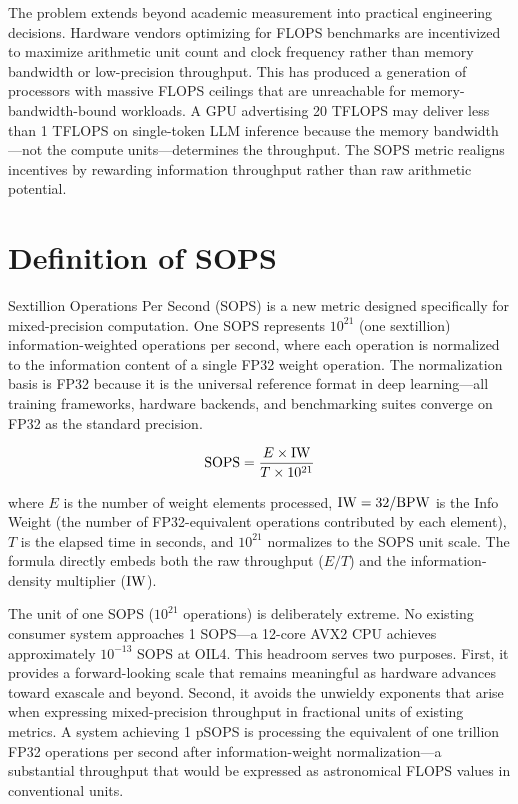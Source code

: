 The problem extends beyond academic measurement into practical engineering decisions. Hardware vendors optimizing for FLOPS benchmarks are incentivized to maximize arithmetic unit count and clock frequency rather than memory bandwidth or low-precision throughput. This has produced a generation of processors with massive FLOPS ceilings that are unreachable for memory-bandwidth-bound workloads. A GPU advertising 20 TFLOPS may deliver less than 1 TFLOPS on single-token LLM inference because the memory bandwidth---not the compute units---determines the throughput. The SOPS metric realigns incentives by rewarding information throughput rather than raw arithmetic potential.

\section{Definition of SOPS}
\label{sec:sops_definition}

Sextillion Operations Per Second (SOPS) is a new metric designed specifically for mixed-precision computation. One SOPS represents $10^{21}$ (one sextillion) information-weighted operations per second, where each operation is normalized to the information content of a single FP32 weight operation. The normalization basis is FP32 because it is the universal reference format in deep learning---all training frameworks, hardware backends, and benchmarking suites converge on FP32 as the standard precision.

\begin{equation}
\text{SOPS} = \frac{E \times \mathrm{IW}}{T \times 10^{21}}
\label{eq:sops_definition}
\end{equation}

where $E$ is the number of weight elements processed, $\mathrm{IW} = 32 / \textnormal{BPW}$ is the Info Weight (the number of FP32-equivalent operations contributed by each element), $T$ is the elapsed time in seconds, and $10^{21}$ normalizes to the SOPS unit scale. The formula directly embeds both the raw throughput ($E/T$) and the information-density multiplier ($\mathrm{IW}$).

The unit of one SOPS ($10^{21}$ operations) is deliberately extreme. No existing consumer system approaches 1 SOPS---a 12-core AVX2 CPU achieves approximately $10^{-13}$ SOPS at OIL4. This headroom serves two purposes. First, it provides a forward-looking scale that remains meaningful as hardware advances toward exascale and beyond. Second, it avoids the unwieldy exponents that arise when expressing mixed-precision throughput in fractional units of existing metrics. A system achieving 1 pSOPS is processing the equivalent of one trillion FP32 operations per second after information-weight normalization---a substantial throughput that would be expressed as astronomical FLOPS values in conventional units.

